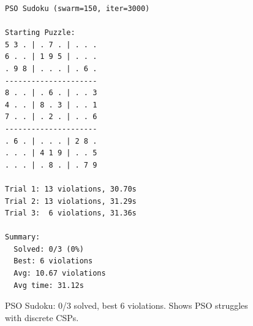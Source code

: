 \documentclass[letterpaper]{article}
\begin{document}
\begin{figure}[h]
\begin{scriptsize}
\begin{verbatim}
PSO Sudoku (swarm=150, iter=3000)

Starting Puzzle:
5 3 . | . 7 . | . . .
6 . . | 1 9 5 | . . .
. 9 8 | . . . | . 6 .
---------------------
8 . . | . 6 . | . . 3
4 . . | 8 . 3 | . . 1
7 . . | . 2 . | . . 6
---------------------
. 6 . | . . . | 2 8 .
. . . | 4 1 9 | . . 5
. . . | . 8 . | . 7 9

Trial 1: 13 violations, 30.70s
Trial 2: 13 violations, 31.29s
Trial 3:  6 violations, 31.36s

Summary:
  Solved: 0/3 (0%)
  Best: 6 violations
  Avg: 10.67 violations
  Avg time: 31.12s
\end{verbatim}
\end{scriptsize}
\caption{PSO Sudoku: 0/3 solved, best 6 violations. Shows PSO struggles with discrete CSPs.}
\label{fig:pso-sudoku}
\end{figure}

\clearpage


\end{document}
